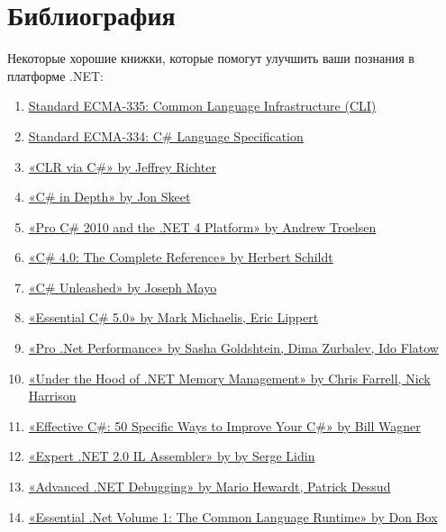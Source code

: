 \chapter*{Библиография}
Некоторые хорошие книжки, которые помогут улучшить ваши познания в платформе .NET:
\begin{enumerate}
  \item \href{http://www.ecma-international.org/publications/standards/Ecma-335.htm}{Standard ECMA-335: Common Language Infrastructure (CLI)}
  \item \href{http://www.ecma-international.org/publications/standards/Ecma-334.htm}{Standard ECMA-334: C\# Language Specification}
  \item \href{https://www.goodreads.com/book/show/16033480-clr-via-c}{«CLR via C\#» by Jeffrey Richter}
  \item \href{https://www.goodreads.com/book/show/7789280-c-in-depth}{«C\# in Depth» by Jon Skeet}
  \item \href{https://www.goodreads.com/book/show/6503209-pro-c-2010-and-the-net-4-platform}{«Pro C\# 2010 and the .NET 4 Platform» by Andrew Troelsen}
  \item \href{https://www.goodreads.com/book/show/8288195-c-4-0}{«C\# 4.0: The Complete Reference» by Herbert Schildt}
  \item \href{https://www.goodreads.com/book/show/5704305-c-unleashed}{«C\# Unleashed» by Joseph Mayo}
  \item \href{https://www.goodreads.com/book/show/15858119-essential-c-5-0}{«Essential C\# 5.0» by Mark Michaelis, Eric Lippert}
  \item \href{https://www.goodreads.com/book/show/15870849-pro-net-performance}{«Pro .Net Performance» by Sasha Goldshtein, Dima Zurbalev, Ido Flatow}
  \item \href{https://www.goodreads.com/book/show/13556198-under-the-hood-of-net-memory-management}{«Under the Hood of .NET Memory Management» by Chris Farrell, Nick Harrison}
  \item \href{https://www.goodreads.com/book/show/7926938-effective-c-covers-c-4-0}{«Effective C\#: 50 Specific Ways to Improve Your C\#» by Bill Wagner}
  \item \href{https://www.goodreads.com/book/show/1063672.Expert_NET_2_0_IL_Assembler}{«Expert .NET 2.0 IL Assembler» by by Serge Lidin}
  \item \href{https://www.goodreads.com/book/show/7306509-advanced-net-debugging}{«Advanced .NET Debugging» by Mario Hewardt, Patrick Dessud}
  \item \href{https://www.goodreads.com/book/show/1670159.Essential_Net_Volume_1}{«Essential .Net Volume 1: The Common Language Runtime» by Don Box}
\end{enumerate}